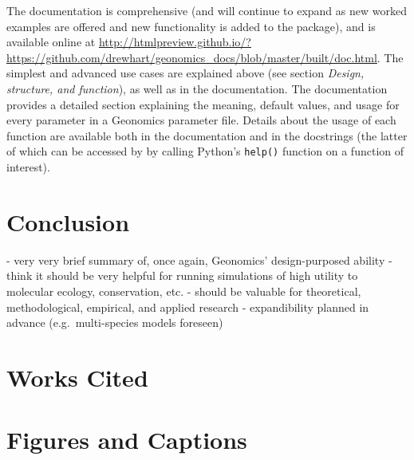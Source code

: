 ﻿\documentclass{article}
\begin{document}
The documentation is comprehensive (and will continue to expand as new worked examples
are offered and new functionality is added to the package), and is available
online at \url{http://htmlpreview.github.io/?https://github.com/drewhart/geonomics\_docs/blob/master/built/doc.html}.  
The simplest and advanced use cases are explained above (see section
\emph{Design, structure, and function}), as well as in the documentation.
The documentation provides a detailed section explaining the meaning,
default values, and usage for every parameter in a Geonomics parameter file.
Details about the usage of each function are available both in the documentation
and in the docstrings (the latter of which can be accessed by by calling Python's
\texttt{help()} function on a function of interest).


\section{Conclusion}
- very very brief summary of, once again, Geonomics' design-purposed ability
- think it should be very helpful for running simulations of high utility to
  molecular ecology, conservation, etc. 
- should be valuable for theoretical, methodological, empirical, and applied research
- expandibility planned in advance (e.g.\ multi-species models foreseen)


\section{Works Cited}




\section{Figures and Captions}
\end{document}

